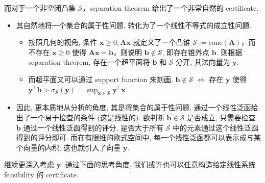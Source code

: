 \documentclass[11pt,UTF8,scheme=plain,fontset=fandol,linespread=1.3]{ctexart}
\numberwithin{figure}{section}
\begin{document}
而对于一个非空闭凸集 $\mathcal{S}$，separation theorem 给出了一个非常自然的 certificate.

\begin{itemize}
\item {}其自然地将一个集合的属于性问题, 转化为了一个线性不等式的成立性问题.

\begin{itemize}
\item {}按照几何的视角, 条件 $\bm{x} \geq 0, \bm{A}\bm{x}$ 就定义了一个凸锥 $\mathcal{S}:= \text{cone}(\bm{A})$，而不存在 $\bm{x} \geq 0$ 使得 $\bm{A}\bm{x} = \bm{b}$，则说明 $\bm{b} \notin \mathcal{S}$, 即存在锥外点 $\bm{b}$. 则根据 separation theorem, 存在一个超平面将 $\bm{b}$ 和 $\mathcal{S}$ 分开, 其法向量为 $\bm{y}$.


\item {}而超平面又可以通过 support function 来刻画, $\bm{b} \notin \mathcal{S}$ $\iff$ 存在 $\bm{y}$ 使得 $\bm{y}^\top \bm{b} > \sigma_{\mathcal{S}}(\bm{y}) = \sup_{\bm{x} \in \mathcal{S}} \bm{y}^\top \bm{x}$.


\end{itemize}


\item {}因此, 更本质地从分析的角度, 其是将集合的属于性问题, 通过一个线性泛函给出了一个易于检查的条件 (这是线性的). 欲判断 $\bm{b} \in \mathcal{S}$ 是否成立, 只需要检查 $\bm{b}$ 通过一个线性泛函得到的评分, 是否大于所有 $\mathcal{S}$ 中的元素通过这个线性泛函得到的评分即可. 而在有限维的欧式空间中, 每一个线性泛函都可以表示成与某个向量的内积, 这也就引入了向量 $\bm{y}$.


\end{itemize}

继续更深入考虑 $\bm{y}$. 通过下面的思考角度, 我们或许也可以任意构造给定线性系统 feasibility 的 certificate.
\end{document}
